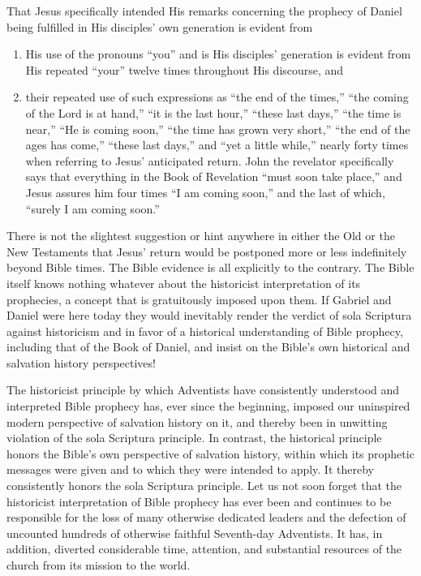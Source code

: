 That Jesus specifically intended His remarks concerning the prophecy of
Daniel being fulfilled in His disciples' own generation is evident from 
\begin{enumerate}
\item
His use of the pronouns ``you'' and is His disciples' generation is
evident from His repeated ``your'' twelve times throughout His discourse, and 
\item
their repeated use of such expressions as ``the end of the times,'' ``the
coming of the Lord is at hand,'' ``it is the last hour,'' ``these last days,''
``the time is near,'' ``He is coming soon,'' ``the time has grown very short,''
``the end of the ages has come,'' ``these last days,'' and ``yet a little while,''
nearly forty times when referring to Jesus' anticipated return. John the
revelator specifically says that everything in the Book of Revelation ``must
soon take place,'' and Jesus assures him four times ``I am coming soon,'' and
the last of which, ``surely I am coming soon.''
\end{enumerate}

There is not the slightest suggestion or hint anywhere in either the Old or
the New Testaments that Jesus' return would be postponed more or less
indefinitely beyond Bible times. The Bible evidence is all explicitly to the
contrary. The Bible itself knows nothing whatever about the historicist
interpretation of its prophecies, a concept that is gratuitously imposed
upon them. If Gabriel and Daniel were here today they would inevitably
render the verdict of sola Scriptura against historicism and in favor of a
historical understanding of Bible prophecy, including that of the Book of
Daniel, and insist on the Bible's own historical and salvation history
perspectives! 

The historicist principle by which Adventists have consistently understood
and interpreted Bible prophecy has, ever since the beginning, imposed our
uninspired modern perspective of salvation history on it, and thereby been
in unwitting violation of the sola Scriptura principle. In contrast, the
historical principle honors the Bible's own perspective of salvation
history, within which its prophetic messages were given and to which they
were intended to apply. It thereby consistently honors the sola Scriptura
principle. Let us not soon forget that the historicist interpretation of
Bible prophecy has ever been and continues to be responsible for the loss of
many otherwise dedicated leaders and the defection of uncounted hundreds of
otherwise faithful Seventh-day Adventists. It has, in addition, diverted
considerable time, attention, and substantial resources of the church from
its mission to the world.

